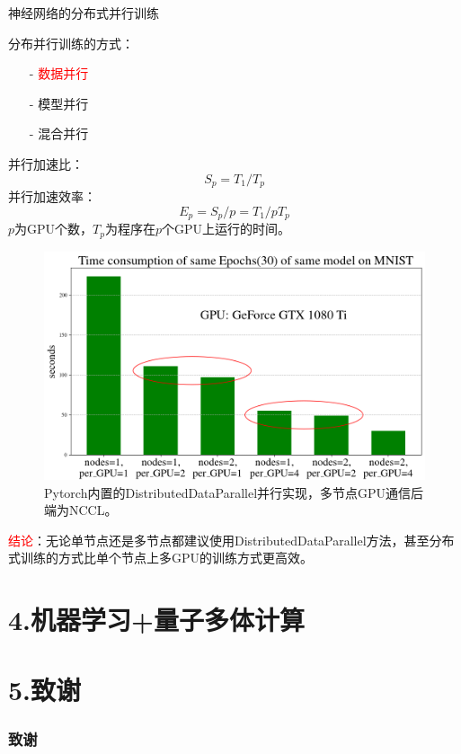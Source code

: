 \documentclass[9pt,t]{beamer} %
\begin{document}
\begin{frame}[t]{神经网络的分布式并行训练}
\begin{minipage}[t]{0.3 \textwidth}
\vspace{0.3cm}
分布并行训练的方式：
\begin{itemize}
\setlength\itemsep{0.1em}
\item[-] \textcolor{red}{数据并行}
\item[-] 模型并行
\item[-] 混合并行
\end{itemize}
并行加速比： 
\[ S_p = T_1 / T_p \]
并行加速效率：
\[ E_p = S_p / p = T_1 / pT_p \]
$p$为GPU个数，$T_p$为程序在$p$个GPU上运行的时间。
\end{minipage}%
\begin{minipage}[t]{0.7 \textwidth}
\begin{figure}
\centering
\includegraphics[width=\textwidth]{time-consumption.png}
\caption{Pytorch内置的DistributedDataParallel并行实现，多节点GPU通信后端为NCCL。}
\end{figure}
\end{minipage}
\textcolor{red}{结论}：无论单节点还是多节点都建议使用DistributedDataParallel方法，甚至分布式训练的方式比单个节点上多GPU的训练方式更高效。
\end{frame}
\section{4.机器学习+量子多体计算}
\title{}
\begin{frame}{}
\vspace{0.25\textwidth}
\end{frame}

\section{5.致谢}
\title{}
\begin{frame}{}
\vspace{0.25\textwidth}
\frametitle{致谢}
\end{frame}
\end{document}
